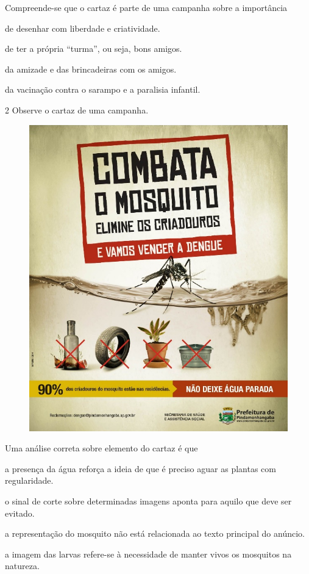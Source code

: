 
Compreende-se que o cartaz é parte de uma campanha sobre a importância

\begin{escolha}
\item de desenhar com liberdade e criatividade.

\item de ter a própria ``turma'', ou seja, bons amigos.

\item da amizade e das brincadeiras com os amigos.

\item da vacinação contra o sarampo e a paralisia infantil.
\end{escolha}

\num{2} Observe o cartaz de uma campanha.


\begin{figure}[htpb!]
\centering
\includegraphics[width=.7\textwidth]{./media/image13.jpeg}
\end{figure}

Uma análise correta sobre elemento do cartaz é que

\begin{escolha}
\item a presença da água reforça a ideia de que é preciso aguar as plantas com regularidade.

\item o sinal de corte sobre determinadas imagens aponta para aquilo que deve ser evitado.

\item a representação do mosquito não está relacionada ao texto principal do anúncio.

\item a imagem das larvas refere-se à necessidade de manter vivos os mosquitos na natureza.
\end{escolha}

